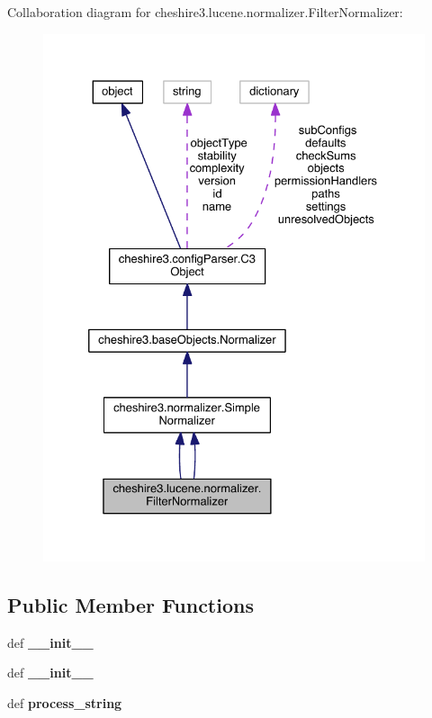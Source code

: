 Collaboration diagram for cheshire3.\-lucene.\-normalizer.\-Filter\-Normalizer\-:
\nopagebreak
\begin{figure}[H]
\begin{center}
\leavevmode
\includegraphics[width=328pt]{classcheshire3_1_1lucene_1_1normalizer_1_1_filter_normalizer__coll__graph}
\end{center}
\end{figure}
\subsection*{Public Member Functions}
\begin{DoxyCompactItemize}
\item 
\hypertarget{classcheshire3_1_1lucene_1_1normalizer_1_1_filter_normalizer_a1256568b7143d9f85ca6e62dd6d97ce0}{def {\bfseries \-\_\-\-\_\-init\-\_\-\-\_\-}}\label{classcheshire3_1_1lucene_1_1normalizer_1_1_filter_normalizer_a1256568b7143d9f85ca6e62dd6d97ce0}

\item 
\hypertarget{classcheshire3_1_1lucene_1_1normalizer_1_1_filter_normalizer_a1256568b7143d9f85ca6e62dd6d97ce0}{def {\bfseries \-\_\-\-\_\-init\-\_\-\-\_\-}}\label{classcheshire3_1_1lucene_1_1normalizer_1_1_filter_normalizer_a1256568b7143d9f85ca6e62dd6d97ce0}

\item 
\hypertarget{classcheshire3_1_1lucene_1_1normalizer_1_1_filter_normalizer_ad3c336a015905ee460f4c8607fb3e93e}{def {\bfseries process\-\_\-string}}\label{classcheshire3_1_1lucene_1_1normalizer_1_1_filter_normalizer_ad3c336a015905ee460f4c8607fb3e93e}

\end{DoxyCompactItemize}
